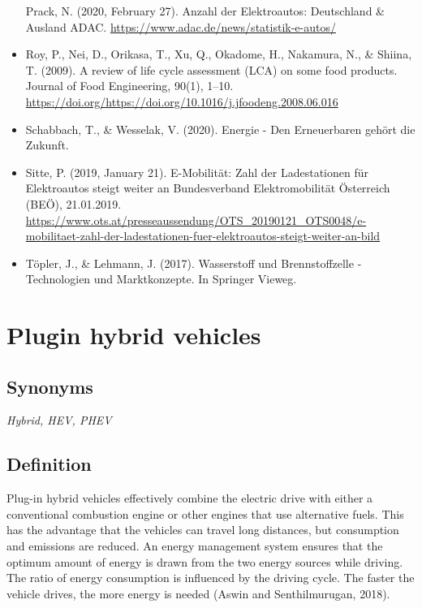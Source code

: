 \documentclass[
]{book}
\begin{document}
\begin{itemize}
  Prack, N. (2020, February 27). Anzahl der Elektroautos: Deutschland \& Ausland \textbar{} ADAC. \url{https://www.adac.de/news/statistik-e-autos/}
\item
  Roy, P., Nei, D., Orikasa, T., Xu, Q., Okadome, H., Nakamura, N., \& Shiina, T. (2009). A review of life cycle assessment (LCA) on some food products. Journal of Food Engineering, 90(1), 1--10. \url{https://doi.org/https://doi.org/10.1016/j.jfoodeng.2008.06.016}
\item
  Schabbach, T., \& Wesselak, V. (2020). Energie - Den Erneuerbaren gehört die Zukunft.
\item
  Sitte, P. (2019, January 21). E-Mobilität: Zahl der Ladestationen für Elektroautos steigt weiter an \textbar{} Bundesverband Elektromobilität Österreich (BEÖ), 21.01.2019. \url{https://www.ots.at/presseaussendung/OTS_20190121_OTS0048/e-mobilitaet-zahl-der-ladestationen-fuer-elektroautos-steigt-weiter-an-bild}
\item
  Töpler, J., \& Lehmann, J. (2017). Wasserstoff und Brennstoffzelle - Technologien und Marktkonzepte. In Springer Vieweg.
\end{itemize}

\hypertarget{plugin_hybrid}{%
\section{Plugin hybrid vehicles}\label{plugin_hybrid}}

\hypertarget{synonyms-33}{%
\subsection*{Synonyms}\label{synonyms-33}}

\emph{Hybrid, HEV, PHEV}

\hypertarget{definition-37}{%
\subsection*{Definition}\label{definition-37}}

Plug-in hybrid vehicles effectively combine the electric drive with either a conventional combustion engine or other engines that use alternative fuels. This has the advantage that the vehicles can travel long distances, but consumption and emissions are reduced. An energy management system ensures that the optimum amount of energy is drawn from the two energy sources while driving. The ratio of energy consumption is influenced by the driving cycle. The faster the vehicle drives, the more energy is needed (Aswin and Senthilmurugan, 2018).
\end{document}
